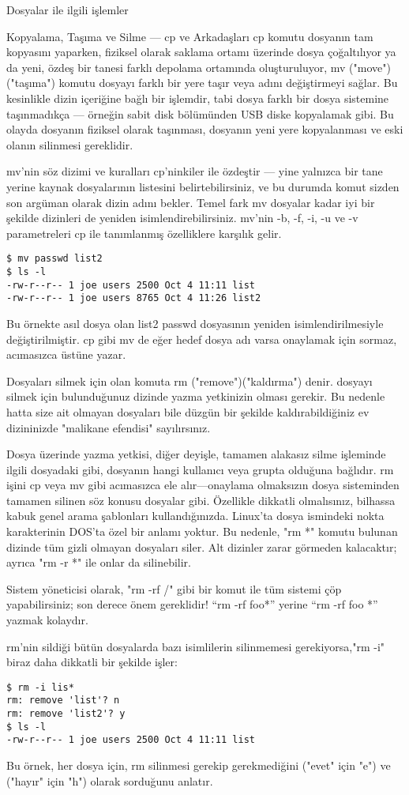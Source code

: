\begin{section}{Dosyalar ile ilgili işlemler}
\begin{subsection}{Kopyalama, Taşıma ve Silme — cp ve Arkadaşları}
cp komutu dosyanın tam kopyasını yaparken, fiziksel olarak saklama ortamı üzerinde dosya çoğaltılıyor ya da yeni, özdeş bir tanesi farklı depolama ortamında oluşturuluyor, mv ("move")("taşıma") komutu dosyayı farklı bir yere taşır veya adını değiştirmeyi sağlar. Bu kesinlikle dizin içeriğine bağlı bir işlemdir, tabi dosya farklı bir dosya sistemine taşınmadıkça — örneğin sabit disk bölümünden USB diske kopyalamak gibi. Bu olayda dosyanın fiziksel olarak taşınması, dosyanın yeni yere kopyalanması ve eski olanın silinmesi gereklidir.

mv'nin söz dizimi ve kuralları cp'ninkiler ile özdeştir — yine yalnızca bir tane yerine kaynak dosyalarının listesini belirtebilirsiniz, ve bu durumda komut sizden son argüman olarak dizin adını bekler. Temel fark mv dosyalar kadar iyi bir şekilde dizinleri de yeniden isimlendirebilirsiniz.
mv'nin -b, -f, -i, -u ve -v parametreleri cp ile tanımlanmış özelliklere karşılık gelir.
\begin{verbatim}
$ mv passwd list2
$ ls -l
-rw-r--r-- 1 joe users 2500 Oct 4 11:11 list
-rw-r--r-- 1 joe users 8765 Oct 4 11:26 list2
\end{verbatim}
Bu örnekte asıl dosya olan list2 passwd dosyasının yeniden isimlendirilmesiyle değiştirilmiştir. cp gibi mv de eğer hedef dosya adı varsa onaylamak için sormaz, acımasızca üstüne yazar.

Dosyaları silmek için olan komuta rm ("remove")("kaldırma") denir. dosyayı silmek için bulunduğunuz dizinde yazma yetkinizin olması gerekir. Bu nedenle hatta size ait olmayan dosyaları bile düzgün bir şekilde kaldırabildiğiniz ev dizininizde "malikane efendisi" sayılırsınız.

Dosya üzerinde yazma yetkisi, diğer deyişle, tamamen alakasız silme işleminde ilgili dosyadaki gibi, dosyanın hangi kullanıcı veya grupta olduğuna bağlıdır. rm işini cp veya mv gibi acımasızca ele alır—onaylama olmaksızın dosya sisteminden tamamen silinen söz konusu dosyalar gibi. Özellikle dikkatli olmalısınız,  bilhassa kabuk genel arama şablonları kullandığınızda. Linux'ta dosya ismindeki nokta karakterinin DOS'ta özel bir anlamı yoktur. Bu nedenle, "rm *" komutu bulunan dizinde tüm gizli olmayan dosyaları siler. Alt dizinler zarar görmeden kalacaktır; ayrıca "rm -r *" ile onlar da silinebilir.

Sistem yöneticisi olarak, "rm -rf /" gibi bir komut ile tüm sistemi çöp yapabilirsiniz; son derece önem gereklidir!  “rm -rf foo*” yerine “rm -rf foo *” yazmak kolaydır.

rm'nin sildiği bütün dosyalarda bazı isimlilerin silinmemesi gerekiyorsa,"rm -i" biraz daha dikkatli bir şekilde işler:
\begin{verbatim}
$ rm -i lis*
rm: remove 'list'? n
rm: remove 'list2'? y
$ ls -l
-rw-r--r-- 1 joe users 2500 Oct 4 11:11 list
\end{verbatim}
Bu örnek, her dosya için, rm silinmesi gerekip gerekmediğini ("evet" için "e") ve ("hayır" için "h") olarak sorduğunu anlatır.


\end{subsection}
\end{section}
